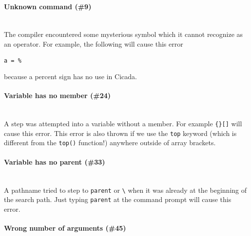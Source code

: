 \documentclass{article}
\newenvironment{code}{
       \begin{list}{}{
               \setlength{\leftmargin}{.4in}
               \setlength{\rightmargin}{0in}
               \setlength{\topsep}{.2in}
       }
       \small
       \item[] }
       { \end{list}   }
\begin{document}
\paragraph{Unknown command (\#9)\\\\}

The compiler encountered some mysterious symbol which it cannot recognize as an operator.  For example, the following will cause this error

\begin{code} \begin{verbatim}
a = %
\end{verbatim} \end{code}

\noindent because a percent sign has no use in Cicada.\\




\paragraph{Variable has no member (\#24)\\\\}

A step was attempted into a variable without a member.  For example \verb#{}[]# will cause this error.  This error is also thrown if we use the \verb#top# keyword (which is different from the \verb#top()# function!) anywhere outside of array brackets.\\




\paragraph{Variable has no parent (\#33)\\\\}

A pathname tried to step to \verb#parent# or \verb#\# when it was already at the beginning of the search path.  Just typing \verb#parent# at the command prompt will cause this error.\\




\paragraph{Wrong number of arguments (\#45)\\\\}
\end{document}

